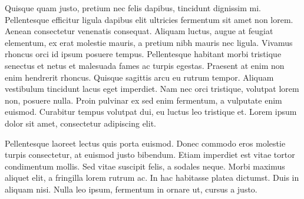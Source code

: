  Quisque quam justo, pretium nec felis dapibus, tincidunt dignissim mi. Pellentesque efficitur ligula dapibus elit ultricies fermentum sit amet non lorem. Aenean consectetur venenatis consequat. Aliquam luctus, augue at feugiat elementum, ex erat molestie mauris, a pretium nibh mauris nec ligula. Vivamus rhoncus orci id ipsum posuere tempus. Pellentesque habitant morbi tristique senectus et netus et malesuada fames ac turpis egestas. Praesent at enim non enim hendrerit rhoncus. Quisque sagittis arcu eu rutrum tempor. Aliquam vestibulum tincidunt lacus eget imperdiet. Nam nec orci tristique, volutpat lorem non, posuere nulla. Proin pulvinar ex sed enim fermentum, a vulputate enim euismod. Curabitur tempus volutpat dui, eu luctus leo tristique et. Lorem ipsum dolor sit amet, consectetur adipiscing elit.
 
 Pellentesque laoreet lectus quis porta euismod. Donec commodo eros molestie turpis consectetur, at euismod justo bibendum. Etiam imperdiet est vitae tortor condimentum mollis. Sed vitae suscipit felis, a sodales neque. Morbi maximus aliquet elit, a fringilla lorem rutrum ac. In hac habitasse platea dictumst. Duis in aliquam nisi. Nulla leo ipsum, fermentum in ornare ut, cursus a justo. 